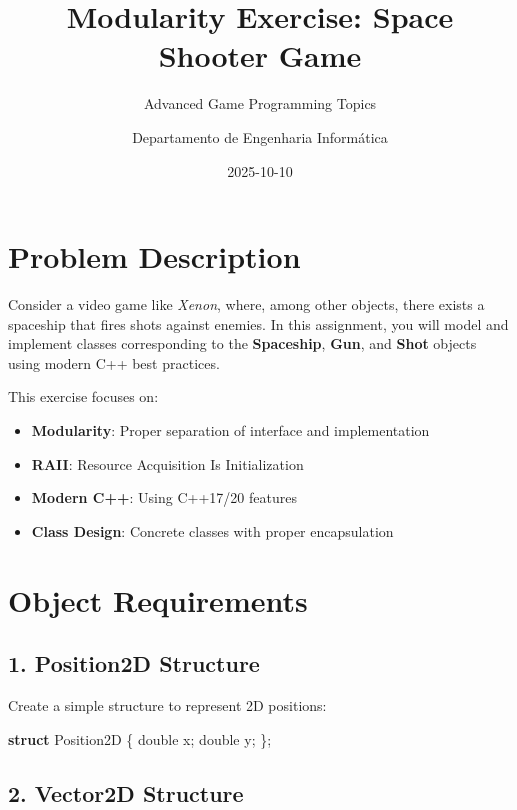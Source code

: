 \documentclass[
]{article}
\title{Modularity Exercise: Space Shooter Game}
\subtitle{Advanced Game Programming Topics}
\author{Departamento de Engenharia Informática}
\date{2025-10-10}
\newenvironment{Shaded}{\begin{snugshade}}{\end{snugshade}}
\newcommand{\DataTypeTok}[1]{\textcolor[rgb]{0.68,0.00,0.00}{#1}}
\newcommand{\KeywordTok}[1]{\textcolor[rgb]{0.00,0.23,0.31}{\textbf{#1}}}
\newcommand{\NormalTok}[1]{\textcolor[rgb]{0.00,0.23,0.31}{#1}}
\newcommand{\OperatorTok}[1]{\textcolor[rgb]{0.37,0.37,0.37}{#1}}
\providecommand{\tightlist}{%
  \setlength{\itemsep}{0pt}\setlength{\parskip}{0pt}}
\begin{document}
\maketitle


\section{Problem Description}\label{problem-description}

Consider a video game like \emph{Xenon}, where, among other objects,
there exists a spaceship that fires shots against enemies. In this
assignment, you will model and implement classes corresponding to the
\textbf{Spaceship}, \textbf{Gun}, and \textbf{Shot} objects using modern
C++ best practices.

This exercise focuses on:

\begin{itemize}
\tightlist
\item
  \textbf{Modularity}: Proper separation of interface and implementation
\item
  \textbf{RAII}: Resource Acquisition Is Initialization
\item
  \textbf{Modern C++}: Using C++17/20 features
\item
  \textbf{Class Design}: Concrete classes with proper encapsulation
\end{itemize}

\section{Object Requirements}\label{object-requirements}

\subsection{1. Position2D Structure}\label{position2d-structure}

Create a simple structure to represent 2D positions:

\begin{Shaded}
\begin{Highlighting}[]
\KeywordTok{struct}\NormalTok{ Position2D }\OperatorTok{\{}
    \DataTypeTok{double}\NormalTok{ x}\OperatorTok{;}
    \DataTypeTok{double}\NormalTok{ y}\OperatorTok{;}
\OperatorTok{\};}
\end{Highlighting}
\end{Shaded}

\subsection{2. Vector2D Structure}\label{vector2d-structure}
\end{document}

